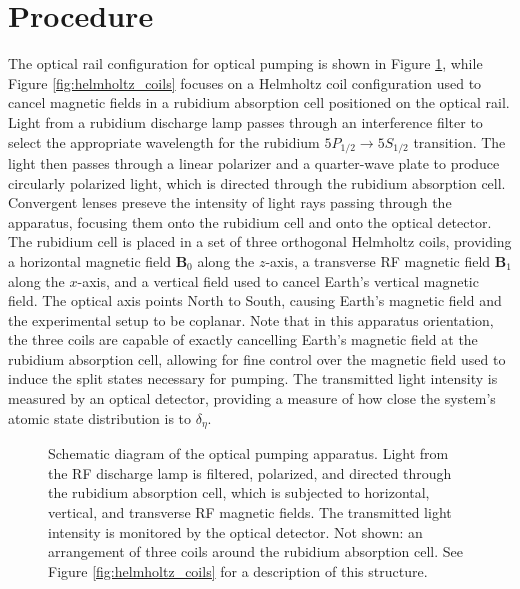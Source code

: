 \documentclass[11pt]{article}
\begin{document}
\section{Procedure}

The optical rail configuration for optical pumping is shown in Figure
\ref{fig:optical_pumping_setup}, while Figure
\ref{fig:helmholtz_coils} focuses on a Helmholtz coil configuration
used to cancel magnetic fields
in a rubidium absorption cell positioned on the optical rail.
Light from a rubidium discharge lamp
passes through an interference filter to select the appropriate
wavelength for the rubidium $5P_{1/2} \rightarrow
5S_{1/2}$ transition. The light then passes through a
linear polarizer and a quarter-wave plate to produce circularly
polarized light, which is directed through the rubidium absorption
cell. Convergent lenses preseve the intensity of light rays passing
through the apparatus, focusing them onto the rubidium cell and onto
the optical detector. The rubidium cell is placed in a set of three orthogonal
Helmholtz coils, providing a horizontal magnetic field
$\mathbf{B}_0$ along the $z$-axis, a transverse RF magnetic field
$\mathbf{B}_1$
along the $x$-axis, and a vertical field used to cancel Earth's
vertical magnetic field. The optical axis points North to South,
causing Earth's magnetic field and the experimental setup to be coplanar.
Note that in this apparatus orientation, the three coils are capable of
exactly cancelling Earth's magnetic field at the
rubidium absorption cell, allowing for fine control over the magnetic
field used to induce the split states necessary for pumping. The
transmitted light intensity is measured
by an optical detector, providing a measure of how close the system's
atomic state distribution is to $\delta_\eta$.

\begin{figure}[H]
  \centering
  \resizebox{\textwidth}{!}{}
  \caption{Schematic diagram of the optical pumping apparatus. Light
    from the RF discharge lamp is filtered, polarized, and directed
    through the rubidium absorption cell, which is subjected to
    horizontal, vertical, and transverse RF magnetic fields. The
    transmitted light intensity is
    monitored by the optical detector. Not shown: an arrangement of three coils
    around the rubidium absorption cell. See Figure
  \ref{fig:helmholtz_coils} for a description of this structure.}
  \label{fig:optical_pumping_setup}
\end{figure}
\end{document}
